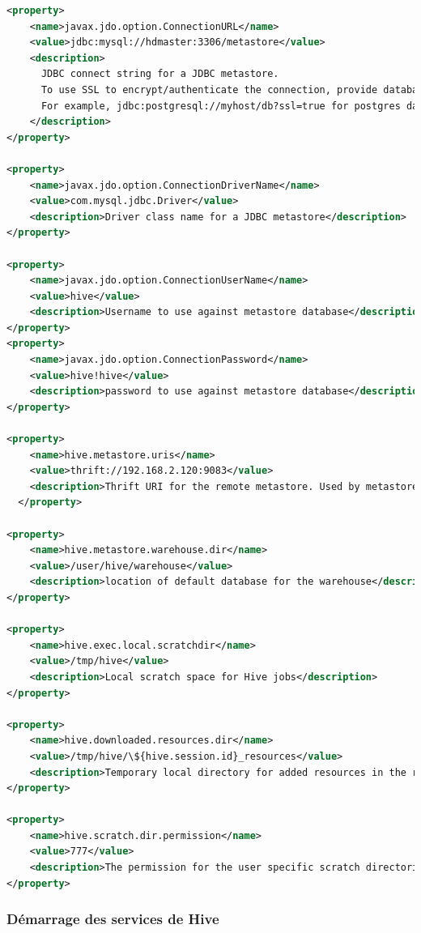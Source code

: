 \documentclass[12pt,english]{book}
\begin{document}
\begin{lstlisting}[language=XML, frame=single, breaklines=true, postbreak=\mbox{\textcolor{red}{$\hookrightarrow$}\space}]
<property>
    <name>javax.jdo.option.ConnectionURL</name>
    <value>jdbc:mysql://hdmaster:3306/metastore</value>
    <description>
      JDBC connect string for a JDBC metastore.
      To use SSL to encrypt/authenticate the connection, provide database-specific SSL flag in the connection URL.
      For example, jdbc:postgresql://myhost/db?ssl=true for postgres database.
    </description>
</property>

<property>
    <name>javax.jdo.option.ConnectionDriverName</name>
    <value>com.mysql.jdbc.Driver</value>
    <description>Driver class name for a JDBC metastore</description>
</property>

<property>
    <name>javax.jdo.option.ConnectionUserName</name>
    <value>hive</value>
    <description>Username to use against metastore database</description>
</property>
<property>
    <name>javax.jdo.option.ConnectionPassword</name>
    <value>hive!hive</value>
    <description>password to use against metastore database</description>
</property>

<property>
    <name>hive.metastore.uris</name>
    <value>thrift://192.168.2.120:9083</value>
    <description>Thrift URI for the remote metastore. Used by metastore client to connect to remote metastore.</description>
  </property>

<property>
    <name>hive.metastore.warehouse.dir</name>
    <value>/user/hive/warehouse</value>
    <description>location of default database for the warehouse</description>
</property>

<property>
    <name>hive.exec.local.scratchdir</name>
    <value>/tmp/hive</value>
    <description>Local scratch space for Hive jobs</description>
</property>

<property>
    <name>hive.downloaded.resources.dir</name>
    <value>/tmp/hive/\${hive.session.id}_resources</value>
    <description>Temporary local directory for added resources in the remote file system.</description>
</property>

<property>
    <name>hive.scratch.dir.permission</name>
    <value>777</value>
    <description>The permission for the user specific scratch directories that get created.</description>
</property>
\end{lstlisting}


\subsubsection{Démarrage des services de Hive}
\end{document}
